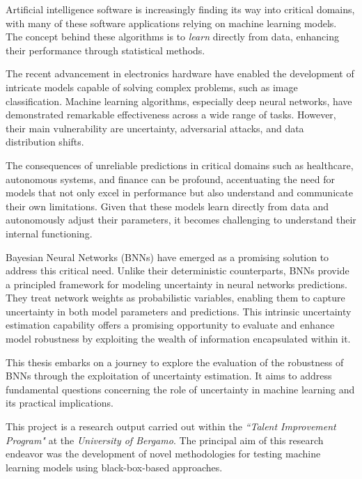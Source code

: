 Artificial intelligence software is increasingly finding its way into critical domains, with many of these software applications relying on machine learning models. The concept behind these algorithms is to \textit{learn} directly from data, enhancing their performance through statistical methods.

The recent advancement in electronics hardware have enabled the development of intricate models capable of solving complex problems, such as image classification. Machine learning algorithms, especially deep neural networks, have demonstrated remarkable effectiveness across a wide range of tasks. However, their main vulnerability are uncertainty, adversarial attacks, and data distribution shifts. 

The consequences of unreliable predictions in critical domains such as healthcare, autonomous systems, and finance can be profound, accentuating the need for models that not only excel in performance but also understand and communicate their own limitations.
Given that these models learn directly from data and autonomously adjust their parameters, it becomes challenging to understand their internal functioning.

Bayesian Neural Networks (BNNs) have emerged as a promising solution to address this critical need. Unlike their deterministic counterparts, BNNs provide a principled framework for modeling uncertainty in neural networks predictions. They treat network weights as probabilistic variables, enabling them to capture uncertainty in both model parameters and predictions. This intrinsic uncertainty estimation capability offers a promising opportunity to evaluate and enhance model robustness by exploiting the wealth of information encapsulated within it.

This thesis embarks on a journey to explore the evaluation of the robustness of BNNs through the exploitation of uncertainty estimation. It aims to address fundamental questions concerning the role of uncertainty in machine learning and its practical implications.

This project is a research output carried out within the \textit{``Talent Improvement Program"} at the \textit{University of Bergamo}. The principal aim of this research endeavor was the development of novel methodologies for testing machine learning models using black-box-based approaches.
